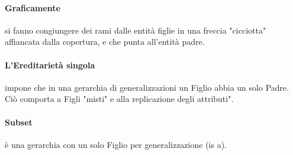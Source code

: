 \paragraph{Graficamente} si fanno congiungere dei rami dalle entità figlie in una freccia "cicciotta" affiancata dalla copertura, e che punta all'entità padre.

\paragraph{L'Ereditarietà singola} impone che in una gerarchia di generalizzazioni un Figlio abbia un solo Padre. Ciò comporta a Figli "misti" e alla replicazione degli attributi".

\paragraph{Subset} è una gerarchia con un solo Figlio per generalizzazione (is a).